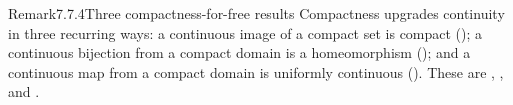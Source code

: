 \documentclass[main.tex]{subfiles}
\begin{document}
\begin{ObjL}{Remark}{7.7.4}{Three compactness-for-free results}
Compactness upgrades continuity in three recurring ways: a continuous image of a compact set is
compact (); a continuous bijection from a compact domain is a homeomorphism
(); and a continuous map from a compact domain is uniformly continuous
(). These are , , and .
\end{ObjL}

\ifSubfilesClassLoaded{\clearpage\objindex}{}
\end{document}
